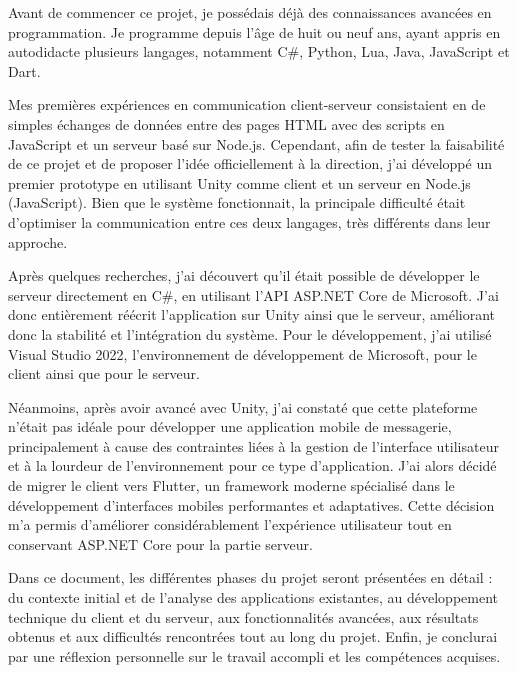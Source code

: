 \documentclass[12pt]{report}
\begin{document}
	Avant de commencer ce projet, je possédais déjà des connaissances avancées en programmation. Je programme depuis l’âge de huit ou neuf ans, ayant appris en autodidacte plusieurs langages, notamment C\#\supercite{csharp}, Python, Lua, Java, JavaScript\supercite{nodejs} et Dart\supercite{dart}.
	
	Mes premières expériences en communication client-serveur consistaient en de simples échanges de données entre des pages HTML avec des scripts en JavaScript\supercite{nodejs} et un serveur basé sur Node.js\supercite{nodejs}. Cependant, afin de tester la faisabilité de ce projet et de proposer l’idée officiellement à la direction, j’ai développé un premier prototype en utilisant Unity\supercite{visualstudio} comme client et un serveur en Node.js (JavaScript\supercite{nodejs}). Bien que le système fonctionnait, la principale difficulté était d’optimiser la communication entre ces deux langages, très différents dans leur approche.
	
	Après quelques recherches, j’ai découvert qu’il était possible de développer le serveur directement en C\#\supercite{csharp}, en utilisant l’API ASP.NET Core\supercite{aspnetcore} de Microsoft. J’ai donc entièrement réécrit l’application sur Unity\supercite{visualstudio} ainsi que le serveur, améliorant donc la stabilité et l’intégration du système. Pour le développement, j’ai utilisé Visual Studio 2022\supercite{visualstudio}, l’environnement de développement de Microsoft, pour le client ainsi que pour le serveur.
	
	Néanmoins, après avoir avancé avec Unity\supercite{visualstudio}, j’ai constaté que cette plateforme n’était pas idéale pour développer une application mobile de messagerie, principalement à cause des contraintes liées à la gestion de l’interface utilisateur et à la lourdeur de l’environnement pour ce type d’application. J’ai alors décidé de migrer le client vers Flutter\supercite{flutter}, un framework moderne spécialisé dans le développement d’interfaces mobiles performantes et adaptatives. Cette décision m’a permis d’améliorer considérablement l’expérience utilisateur tout en conservant ASP.NET Core\supercite{aspnetcore} pour la partie serveur.
	
	Dans ce document, les différentes phases du projet seront présentées en détail : du contexte initial et de l’analyse des applications existantes, au développement technique du client et du serveur, aux fonctionnalités avancées, aux résultats obtenus et aux difficultés rencontrées tout au long du projet. Enfin, je conclurai par une réflexion personnelle sur le travail accompli et les compétences acquises.
	
\end{document}
